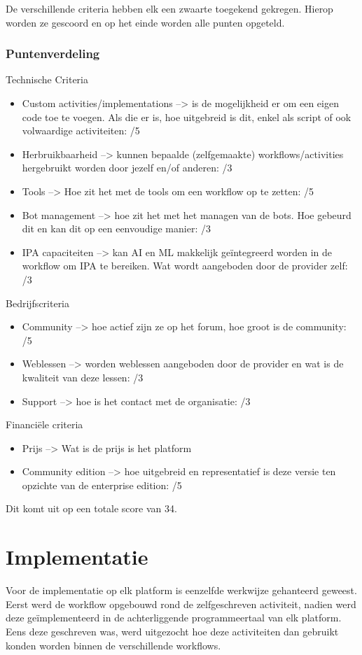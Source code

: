 De verschillende criteria hebben elk een zwaarte toegekend gekregen. Hierop worden ze gescoord en op het einde worden alle punten opgeteld.

\subsubsection{Puntenverdeling}
Technische Criteria
\begin{itemize}
	\item Custom activities/implementations --> is de mogelijkheid er om een eigen code toe te voegen. Als die er is, hoe uitgebreid is dit, enkel als script of ook volwaardige activiteiten: /5
	\item Herbruikbaarheid --> kunnen bepaalde (zelfgemaakte) workflows/activities hergebruikt worden door jezelf en/of anderen: /3
	\item Tools --> Hoe zit het met de tools om een workflow op te zetten: /5
	\item Bot management --> hoe zit het met het managen van de bots. Hoe gebeurd dit en kan dit op een eenvoudige manier: /3
	\item IPA capaciteiten --> kan AI en ML makkelijk geïntegreerd worden in de workflow om IPA te bereiken. Wat wordt aangeboden door de provider zelf: /3
\end{itemize}

Bedrijfscriteria
\begin{itemize}
	\item Community --> hoe actief zijn ze op het forum, hoe groot is de community: /5
	\item Weblessen --> worden weblessen aangeboden door de provider en wat is de kwaliteit van deze lessen: /3
	\item Support --> hoe is het contact met de organisatie: /3
\end{itemize}

Financiële criteria
\begin{itemize}
	\item Prijs --> Wat is de prijs is het platform
	\item Community edition --> hoe uitgebreid en representatief is deze versie ten opzichte van de enterprise edition: /5
\end{itemize}

Dit komt uit op een totale score van 34.

\section{Implementatie}
Voor de implementatie op elk platform is eenzelfde werkwijze gehanteerd geweest. Eerst werd de workflow opgebouwd rond de zelfgeschreven activiteit, nadien werd deze geïmplementeerd in de achterliggende programmeertaal van elk platform. Eens deze geschreven was, werd uitgezocht hoe deze activiteiten dan gebruikt konden worden binnen de verschillende workflows.

